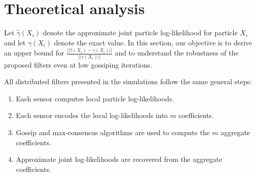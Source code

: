 \documentclass[10pt,letterpaper,final]{article}
\begin{document}


\section{Theoretical analysis}
Let $\hat{\gamma}(X_i)$ denote the approximate joint particle log-likelihood for particle $X_i$ and let $\gamma(X_i)$ denote the exact value. In this section, our objective is to derive an upper bound for $\frac{||\hat{\gamma}(X_i)-\gamma(X_i)||}{||\gamma(X_i)||}$ and to understand the robustness of the proposed filters even at low gossiping iterations.

All distributed filters presented in the simulations follow the same general steps:
\begin{enumerate}
\item Each sensor computes local particle log-likelihoods.
\item Each sensor encodes the local log-likelihoods into $m$ coefficients.
\item Gossip and max-consensus algorithms are used to compute the $m$ aggregate coefficients. 
\item Approximate joint log-likelihoods are recovered from the aggregate coefficients. 
\end{enumerate}
\end{document}
